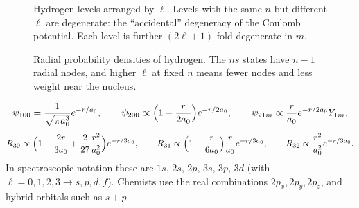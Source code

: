 \begin{figure}[ht]
\centering
{}
\caption{Hydrogen levels arranged by $\ell$. Levels with the same $n$ but different $\ell$ are degenerate: the ``accidental'' degeneracy of the Coulomb potential. Each level is further $(2\ell+1)$-fold degenerate in $m$.}
\end{figure}

\begin{figure}[ht]
\centering
{}
\caption{Radial probability densities of hydrogen. The $ns$ states have $n-1$ radial nodes, and higher $\ell$ at fixed $n$ means fewer nodes and less weight near the nucleus.}
\end{figure}

\begin{example}
\[
    \psi_{100} = \frac{1}{\sqrt{\pi a_0^3}}e^{-r/a_0},
    \qquad
    \psi_{200}\propto\Bigl(1-\frac{r}{2a_0}\Bigr)e^{-r/2a_0},
    \qquad
    \psi_{21m}\propto\frac{r}{a_0}e^{-r/2a_0}Y_{1m},
\]
\[
    R_{30}\propto\Bigl(1 - \frac{2r}{3a_0} + \frac{2}{27}\frac{r^2}{a_0^2}\Bigr)e^{-r/3a_0},
    \qquad
    R_{31}\propto\Bigl(1-\frac{r}{6a_0}\Bigr)\frac{r}{a_0}e^{-r/3a_0},
    \qquad
    R_{32}\propto\frac{r^2}{a_0^2}e^{-r/3a_0}.
\]
In spectroscopic notation these are $1s$, $2s$, $2p$, $3s$, $3p$, $3d$ (with $\ell = 0,1,2,3\to s,p,d,f$). Chemists use the real combinations $2p_x,2p_y,2p_z$, and hybrid orbitals such as $s+p$.
\end{example}


